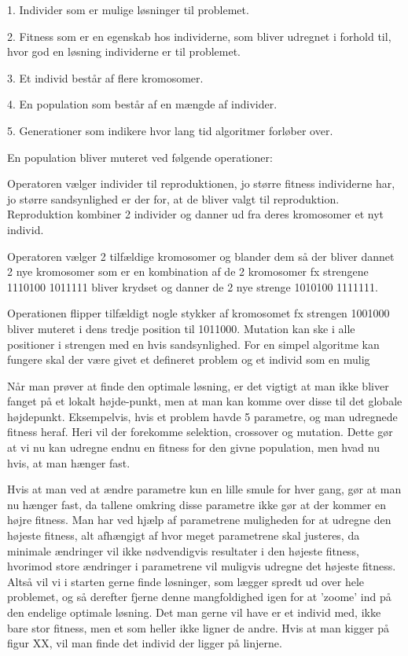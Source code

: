 1.	Individer som er mulige løsninger til problemet.

2.	Fitness som er en egenskab hos individerne, som bliver udregnet i forhold til, hvor god en løsning individerne er til problemet.

3.	Et individ består af flere kromosomer.

4.	En population som består af en mængde af individer.

5.	Generationer som indikere hvor lang tid algoritmer forløber over.

En population bliver muteret ved følgende operationer:


Operatoren vælger individer til reproduktionen, jo større fitness individerne har, jo større sandsynlighed er der for, at de bliver valgt til reproduktion. Reproduktion kombiner 2 individer og danner ud fra deres kromosomer et nyt individ.


Operatoren vælger 2 tilfældige kromosomer og blander dem så der bliver dannet 2 nye kromosomer som er en kombination af de 2 kromosomer fx strengene 1110100 1011111 bliver krydset og danner de 2 nye strenge 1010100 1111111.


Operationen flipper tilfældigt nogle stykker af kromosomet fx strengen 1001000 bliver muteret i dens tredje position til 1011000. Mutation kan ske i alle positioner i strengen med en hvis sandsynlighed. For en simpel algoritme kan fungere skal der være givet et defineret problem og et individ som en mulig


Når man prøver at finde den optimale løsning, er det vigtigt at man ikke bliver fanget på et lokalt højde-punkt, men at man kan komme over disse til det globale højdepunkt. Eksempelvis, hvis et problem havde 5 parametre, og man udregnede fitness heraf. Heri vil der forekomme selektion, crossover og mutation. Dette gør at vi nu kan udregne endnu en fitness for den givne population, men hvad nu hvis, at man hænger fast. 

Hvis at man ved at ændre parametre kun en lille smule for hver gang, gør at man nu hænger fast, da tallene omkring disse parametre ikke gør at der kommer en højre fitness. Man har ved hjælp af parametrene muligheden for at udregne den højeste fitness, alt afhængigt af hvor meget parametrene skal justeres, da minimale ændringer vil ikke nødvendigvis resultater i den højeste fitness, hvorimod store ændringer i parametrene vil muligvis udregne det højeste fitness. Altså vil vi i starten gerne finde løsninger, som lægger spredt ud over hele problemet, og så derefter fjerne denne mangfoldighed igen for at ’zoome’ ind på den endelige optimale løsning. 
Det man gerne vil have er et individ med, ikke bare stor fitness, men et som heller ikke ligner de andre. Hvis at man kigger på figur XX, vil man finde det individ der ligger på linjerne.

